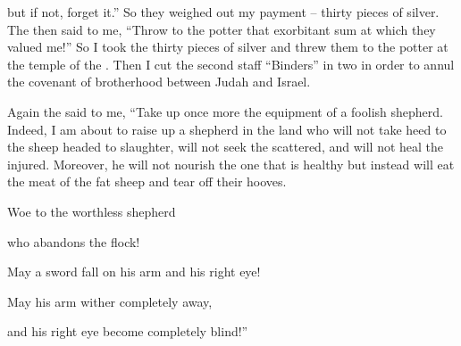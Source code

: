 {but if
not,
forget
it.” So they weighed out
my payment
– thirty
pieces of silver.
The
{}
then said
to
me, “Throw
to
the potter
that exorbitant
sum
at which
they valued
me!” So
I took
the thirty
pieces of silver
and threw
them to
the
potter
at the temple
of the
{}.
Then I cut
the second
staff
“Binders”
in two in order to annul
the covenant of brotherhood
between
Judah
and Israel.
\par }{\PP {}Again
the {}
said
to me,
“Take
up once more
the equipment
of a foolish
shepherd.
Indeed,
I
am about to raise up
a shepherd
in the land
who will not
take heed
to the sheep headed to slaughter,
will not
seek
the scattered,
and will not
heal
the injured.
Moreover, he will not
nourish
the one that is healthy
but instead will eat
the meat
of the fat
sheep and tear off
their hooves.
\par }{\Q {}Woe
to the worthless
shepherd
\par }{\Q who abandons
the flock!
\par }{\Q May a sword
fall on
his arm
and his right
eye!
\par }{\Q May his
arm
wither
completely away,
\par }{\Q and his right
eye
become completely
blind!”

}
